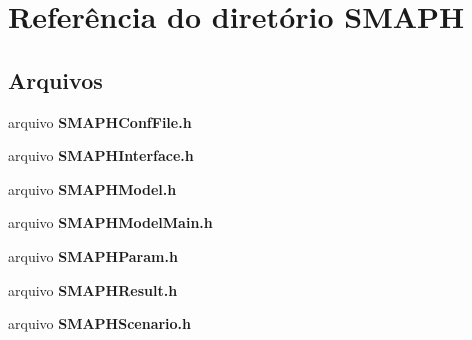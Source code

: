 \section{Referência do diretório S\+M\+A\+PH}
\label{dir_4b4a665c52a0bbc5f99c69d63a5efc01}
\subsection*{Arquivos}
\begin{DoxyCompactItemize}
\item 
arquivo {\bf S\+M\+A\+P\+H\+Conf\+File.\+h}
\item 
arquivo {\bf S\+M\+A\+P\+H\+Interface.\+h}
\item 
arquivo {\bf S\+M\+A\+P\+H\+Model.\+h}
\item 
arquivo {\bf S\+M\+A\+P\+H\+Model\+Main.\+h}
\item 
arquivo {\bf S\+M\+A\+P\+H\+Param.\+h}
\item 
arquivo {\bf S\+M\+A\+P\+H\+Result.\+h}
\item 
arquivo {\bf S\+M\+A\+P\+H\+Scenario.\+h}
\end{DoxyCompactItemize}
